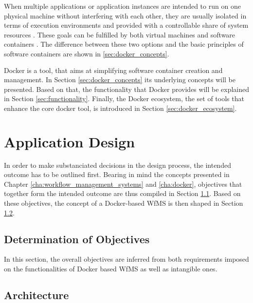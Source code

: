 \documentclass[language=english,noinputenc]{wiwwuwordrprt}
\begin{document}
    When multiple applications or application instances are intended to run on one physical machine without interfering with each other, they are usually isolated in terms of execution environments and provided with a controllable share of system resources \cite{Felter2014Updated}. These goals can be fulfilled by both virtual machines and software containers \cite{Ruiz2015Performance}. The difference between these two options and the basic principles of software containers are shown in \ref{sec:docker_concepts}.

    Docker is a tool, that aims at simplifying software container creation and management. In Section \ref{sec:docker_concepts} its underlying concepts will be presented. Based on that, the functionality that Docker provides will be explained in Section \ref{sec:functionality}. Finally, the Docker ecosystem, \ie the set of tools that enhance the core docker tool, is introduced in Section \ref{sec:docker_ecosystem}.

    

  \chapter{Application Design} %
    \label{cha:solution_design}

    In order to make substanciated decisions in the design process, the intended outcome has to be outlined first. Bearing in mind the concepts presented in Chapter \ref{cha:workflow_management_systems} and \ref{cha:docker}, objectives that together form the intended outcome are thus compiled in Section \ref{sec:determination_of_objectives}. Based on these objectives, the concept of a Docker-based \ac{WfMS} is then shaped in Section \ref{sec:architecture}.

    \section{Determination of Objectives} %
      \label{sec:determination_of_objectives}

      In this section, the overall objectives are inferred from both requirements imposed on the functionalities of Docker based \ac{WfMS} as well as intangible ones.

      

    \section{Architecture} %
      \label{sec:architecture}
\end{document}
